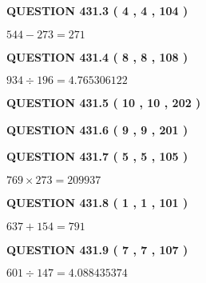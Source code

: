 \documentclass{ctexart}
\begin{document}
 
  
\vspace{0.2in}
  
{\textbf{\Large{QUESTION
431.3 
 ( 4 , 4 , 104 )
}}}
  
  
 
 

$ %
544 -  %
273=   %
271$
 
 
  
\vspace{0.2in}
  
{\textbf{\Large{QUESTION
431.4 
 ( 8 , 8 , 108 )
}}}
  
  
 
 

$ %
934 \div  %
196=   %
4.765306122$
 
 
  
\vspace{0.2in}
  
{\textbf{\Large{QUESTION
431.5 
 ( 10 , 10 , 202 )
}}}
  
  
  
\vspace{0.2in}
  
{\textbf{\Large{QUESTION
431.6 
 ( 9 , 9 , 201 )
}}}
  
  
  
\vspace{0.2in}
  
{\textbf{\Large{QUESTION
431.7 
 ( 5 , 5 , 105 )
}}}
  
  
 
 

$ %
769 \times  %
273=   %
209937$
 
 
  
\vspace{0.2in}
  
{\textbf{\Large{QUESTION
431.8 
 ( 1 , 1 , 101 )
}}}
  
  
 
 

$ %
637 +  %
154=   %
791$
 
 
  
\vspace{0.2in}
  
{\textbf{\Large{QUESTION
431.9 
 ( 7 , 7 , 107 )
}}}
  
  
 
 

$ %
601 \div  %
147=   %
4.088435374$
 
 
  
\vspace{0.2in}
  
\end{document}
